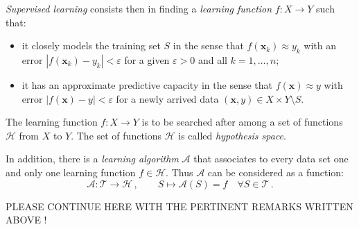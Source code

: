 \begin{description}[style=unboxed,leftmargin=0cm,itemsep=3ex]
\begin{enumerate}
{{\em Supervised learning\/} consists then in finding a
{\em learning function\/} $f:X\to Y$ such that:


\begin{itemize}
\item
it closely models the training set $S$ in the sense that
$f(\mathbf{x}_k)\approx y_k$ with an error
$|f(\mathbf{x}_k)-y_k|<\varepsilon$ for a given $\varepsilon>0$
and all $k=1,\dots,n$;
\item
it has an approximate predictive capacity in the sense that
$f(\mathbf{x})\approx y$ with error $|f(\mathbf{x})-y|<\varepsilon$
for a newly arrived data $(\mathbf{x},y)\in X\times Y\setminus S$.
\end{itemize}
The learning function $f:X\to Y$ is to be searched after among a set
of functions $\mathscr{H}$ from $X$ to $Y$.
The set of functions $\mathscr{H}$ is called {\em hypothesis space\/}.


In addition, there is a {\em learning algorithm\/} $\mathcal{A}$ that
associates to every data set one and only one learning function
$f\in\mathscr{H}$.
Thus $\mathcal{A}$ can be considered as a function:
$$
\mathcal{A}:\mathscr{T}\to\mathscr{H}\,,\qquad
S\mapsto\mathcal{A}(S)=f\quad\forall S\in\mathscr{T}\,.
$$ 

PLEASE CONTINUE HERE WITH THE PERTINENT REMARKS WRITTEN ABOVE !

}

\end{enumerate}

\end{description}



